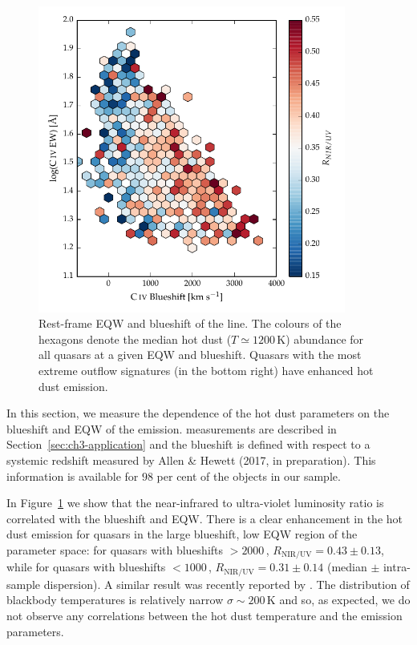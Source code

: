 \begin{figure}[t!]
\centering
  \includegraphics[width=0.9\textwidth]{figures/chapter05/hot_dust_ratio.pdf}
\caption[{Hot dust abundance as a function of rest-frame EQW and blueshift of the  line.}]{Rest-frame EQW and blueshift of the  line. The colours of the hexagons denote the median hot dust ($T\simeq1200$\,K) abundance for all quasars at a given EQW and blueshift. Quasars with the most extreme outflow signatures (in the bottom right) have enhanced hot dust emission.}
  \label{fig:civ_hot_dust}
\end{figure}

In this section, we measure the dependence of the hot dust parameters on the blueshift and EQW of the  emission. 
 measurements are described in Section~\ref{sec:ch3-application} and the  blueshift is defined with respect to a systemic redshift measured by Allen \& Hewett (2017, in preparation). 
This information is available for $98$ per cent of the objects in our sample. 

In Figure~\ref{fig:civ_hot_dust} we show that the near-infrared to ultra-violet luminosity ratio is correlated with the  blueshift and EQW. 
There is a clear enhancement in the hot dust emission for quasars in the large  blueshift, low EQW region of the parameter space: for quasars with  blueshifts $>2000$\,\kms, $R_{\text{NIR/UV}}=0.43\pm0.13$, while for quasars with  blueshifts $<1000$\,\kms, $R_{\text{NIR/UV}}=0.31\pm0.14$ (median $\pm$ intra-sample dispersion).
A similar result was recently reported by \citet{wang13}. 
The distribution of blackbody temperatures is relatively narrow $\sigma\sim200$\,K and so, as expected, we do not observe any correlations between the hot dust temperature and the  emission parameters. 

